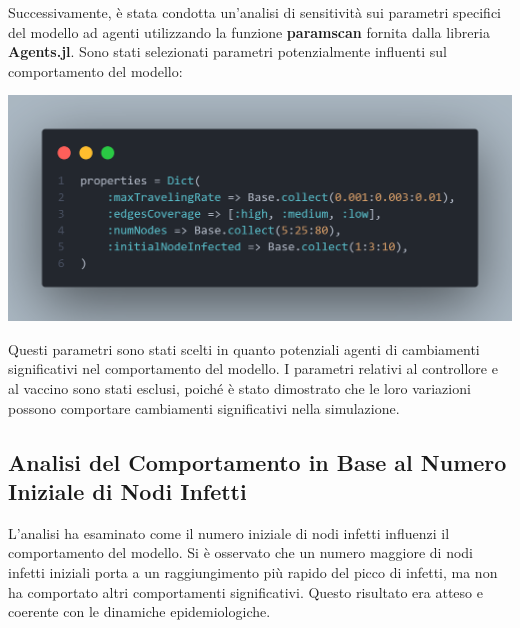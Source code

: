 Successivamente, è stata condotta un'analisi di sensitività sui 
parametri specifici del modello ad agenti utilizzando la funzione 
\textbf{paramscan} fornita dalla libreria \textbf{Agents.jl}. 
Sono stati selezionati parametri potenzialmente influenti sul 
comportamento del modello:

\begin{minipage}{\linewidth}
	\centering
	\includegraphics[width=\textwidth]{img/paramscan.png}
	\label{fig:paramscan}
\end{minipage}

Questi parametri sono stati scelti in quanto potenziali 
agenti di cambiamenti significativi nel comportamento del modello. 
I parametri relativi al controllore e al vaccino sono stati esclusi, 
poiché è stato dimostrato che le loro variazioni possono comportare 
cambiamenti significativi nella simulazione.
\newpage

\subsection{Analisi del Comportamento in Base al Numero Iniziale di Nodi Infetti}

L'analisi ha esaminato come il numero iniziale di nodi infetti 
influenzi il comportamento del modello. Si è osservato che un numero 
maggiore di nodi infetti iniziali porta a un raggiungimento più 
rapido del picco di infetti, ma non ha comportato altri comportamenti 
significativi. Questo risultato era atteso e coerente con le 
dinamiche epidemiologiche.

